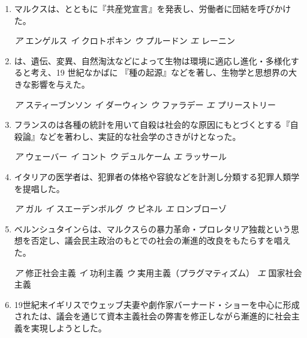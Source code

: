 \documentclass[uplatex,dvipdfmx]{jsarticle}
\newcommand{\sentakusi}[4]{
\hspace{.3zw}
\emph{ア}\hspace{1zw} #1 \hspace{2zw} \emph{イ} \hspace{1zw}#2 \hspace{2zw}\emph{ウ}\hspace{1zw} #3 \hspace{2zw}\emph{エ}\hspace{1zw} #4

}
\begin{document}
\begin{enumerate}
\sentakusi
{ミル}
{バーリン}
{ハクスリー}
{トゥルース}


\item   マルクスは、とともに『共産党宣言』を発表し、労働者に団結を呼びかけた。

\sentakusi
{エンゲルス}
{クロトポキン}
{プルードン}
{レーニン}


\item   {}は、遺伝、変異、自然淘汰などによって生物は環境に適応し進化・多様化すると考え、19 世紀なかばに 『種の起源』などを著し、生物学と思想界の大きな影響を与えた。

\sentakusi
{スティーブンソン}
{ダーウィン}
{ファラデー}
{プリーストリー}






\item   フランスのは各種の統計を用いて自殺は社会的な原因にもとづくとする『自殺論』などを著わし、実証的な社会学のさきがけとなった。

\sentakusi
{ウェーバー}
{コント}
{デュルケーム}
{ラッサール}




\item   イタリアの医学者は、犯罪者の体格や容貌などを計測し分類する犯罪人類学を提唱した。

\sentakusi
{ガル}
{スエーデンボルグ}
{ピネル}
{ロンブローゾ}


\item ベルンシュタインらは、マルクスらの暴力革命・プロレタリア独裁という思想を否定し、議会民主政治のもとでの社会の漸進的改良をもたらすを唱えた。

\sentakusi
{修正社会主義}
{功利主義}
{実用主義（プラグマティズム）}
{国家社会主義}


\item   19世紀末イギリスでウェッブ夫妻や劇作家バーナード・ショーを中心に形成されたは、議会を通じて資本主義社会の弊害を修正しながら漸進的に社会主義を実現しようとした。



\end{enumerate}
\end{document}
